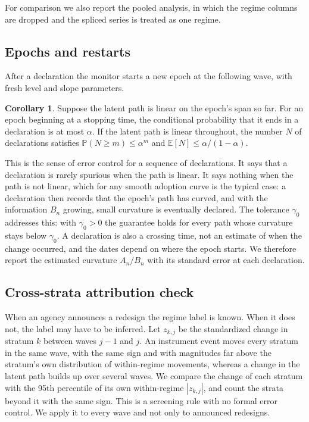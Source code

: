 \documentclass[Afour,sageh,times]{sagej}
\theoremstyle{definition}
\newtheorem{corollary}{Corollary}
\newcommand{\E}{\mathbb{E}}
\newcommand{\Prob}{\mathbb{P}}
\begin{document}
For comparison we also report the pooled analysis, in which the regime columns are dropped and the spliced series is treated as one regime.

\subsection{Epochs and restarts}
\label{sec:epochs}

After a declaration the monitor starts a new epoch at the following wave, with fresh level and slope parameters.

\begin{corollary}
\label{cor:epochs}
Suppose the latent path is linear on the epoch's span so far. For an epoch beginning at a stopping time, the conditional probability that it ends in a declaration is at most $\alpha$. If the latent path is linear throughout, the number $N$ of declarations satisfies $\Prob(N \ge m) \le \alpha^m$ and $\E[N] \le \alpha/(1-\alpha)$.
\end{corollary}

This is the sense of error control for a sequence of declarations. It says that a declaration is rarely spurious when the path is linear. It says nothing when the path is not linear, which for any smooth adoption curve is the typical case: a declaration then records that the epoch's path has curved, and with the information $B_n$ growing, small curvature is eventually declared. The tolerance $\gamma_0$ addresses this: with $\gamma_0 > 0$ the guarantee holds for every path whose curvature stays below $\gamma_0$. A declaration is also a crossing time, not an estimate of when the change occurred, and the dates depend on where the epoch starts. We therefore report the estimated curvature $A_n/B_n$ with its standard error at each declaration.

\subsection{Cross-strata attribution check}
\label{sec:diagnostic}

When an agency announces a redesign the regime label is known. When it does not, the label may have to be inferred. Let $z_{k,j}$ be the standardized change in stratum $k$ between waves $j-1$ and $j$. An instrument event moves every stratum in the same wave, with the same sign and with magnitudes far above the stratum's own distribution of within-regime movements, whereas a change in the latent path builds up over several waves. We compare the change of each stratum with the 95th percentile of its own within-regime $|z_{k,j}|$, and count the strata beyond it with the same sign. This is a screening rule with no formal error control. We apply it to every wave and not only to announced redesigns.
\end{document}
